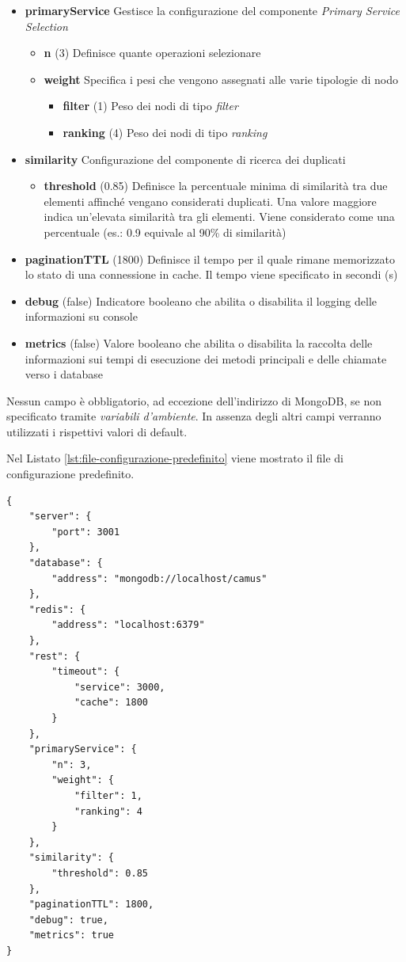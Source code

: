 \begin{itemize}
\begin{itemize}
\begin{itemize}
		\end{itemize}
	\end{itemize}
	\item \textbf{primaryService} Gestisce la configurazione del componente \emph{Primary Service Selection}
	\begin{itemize}
		\item \textbf{n} (3) Definisce quante operazioni selezionare
		\item \textbf{weight} Specifica i pesi che vengono assegnati alle varie tipologie di nodo
		\begin{itemize}
			\item \textbf{filter} (1) Peso dei nodi di tipo \emph{filter}
			\item \textbf{ranking} (4) Peso dei nodi di tipo \emph{ranking}
		\end{itemize}
	\end{itemize}
	\item \textbf{similarity} Configurazione del componente di ricerca dei duplicati
	\begin{itemize}
		\item \textbf{threshold} (0.85) Definisce la percentuale minima di similarità tra due elementi affinché vengano considerati duplicati. Una valore maggiore indica un'elevata similarità tra gli elementi. Viene considerato come una percentuale (es.: 0.9 equivale al 90\% di similarità)
	\end{itemize}
	\item \textbf{paginationTTL} (1800) Definisce il tempo per il quale rimane memorizzato lo stato di una connessione in cache. Il tempo viene specificato in secondi (s)
	\item \textbf{debug} (false) Indicatore booleano che abilita o disabilita il logging delle informazioni su console
	\item \textbf{metrics} (false) Valore booleano che abilita o disabilita la raccolta delle informazioni sui tempi di esecuzione dei metodi principali e delle chiamate verso i database
\end{itemize}

Nessun campo è obbligatorio, ad eccezione dell'indirizzo di MongoDB, se non specificato tramite \emph{variabili d'ambiente}. In assenza degli altri campi verranno utilizzati i rispettivi valori di default.

Nel Listato \ref{lst:file-configurazione-predefinito} viene mostrato il file di configurazione predefinito.

\begin{lstlisting}[style=blocco-esempi,
								caption=File di configurazione predefinito,
								label=lst:file-configurazione-predefinito]
{
	"server": {
		"port": 3001
	},
	"database": {
		"address": "mongodb://localhost/camus"
	},
	"redis": {
		"address": "localhost:6379"
	},
	"rest": {
		"timeout": {
			"service": 3000,
			"cache": 1800
		}
	},
	"primaryService": {
		"n": 3,
		"weight": {
			"filter": 1,
			"ranking": 4
		}
	},
	"similarity": {
		"threshold": 0.85
	},
	"paginationTTL": 1800,
	"debug": true,
	"metrics": true
}
\end{lstlisting}